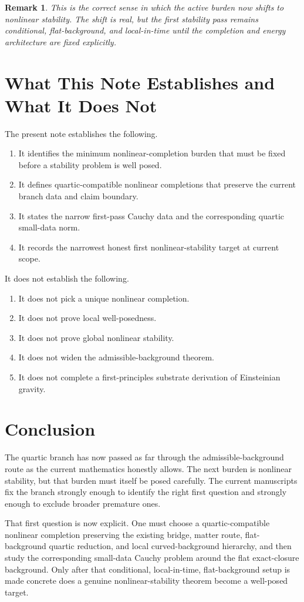 \documentclass[11pt]{article}
\newtheorem{remark}{Remark}
\begin{document}
\begin{remark}
This is the correct sense in which the active burden now shifts to nonlinear stability. The shift is real, but the first stability pass remains conditional, flat-background, and local-in-time until the completion and energy architecture are fixed explicitly.
\end{remark}

\section{What This Note Establishes and What It Does Not}

The present note establishes the following.
\begin{enumerate}
    \item It identifies the minimum nonlinear-completion burden that must be fixed before a stability problem is well posed.
    \item It defines quartic-compatible nonlinear completions that preserve the current branch data and claim boundary.
    \item It states the narrow first-pass Cauchy data and the corresponding quartic small-data norm.
    \item It records the narrowest honest first nonlinear-stability target at current scope.
\end{enumerate}

It does not establish the following.
\begin{enumerate}
    \item It does not pick a unique nonlinear completion.
    \item It does not prove local well-posedness.
    \item It does not prove global nonlinear stability.
    \item It does not widen the admissible-background theorem.
    \item It does not complete a first-principles substrate derivation of Einsteinian gravity.
\end{enumerate}

\section{Conclusion}

The quartic branch has now passed as far through the admissible-background route as the current mathematics honestly allows. The next burden is nonlinear stability, but that burden must itself be posed carefully. The current manuscripts fix the branch strongly enough to identify the right first question and strongly enough to exclude broader premature ones.

That first question is now explicit. One must choose a quartic-compatible nonlinear completion preserving the existing bridge, matter route, flat-background quartic reduction, and local curved-background hierarchy, and then study the corresponding small-data Cauchy problem around the flat exact-closure background. Only after that conditional, local-in-time, flat-background setup is made concrete does a genuine nonlinear-stability theorem become a well-posed target.
\end{document}
